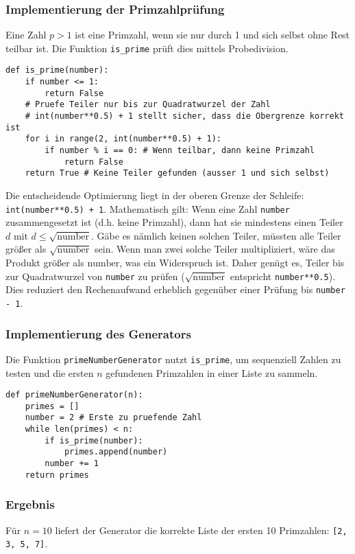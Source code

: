 \documentclass[titlepage]{article}
\begin{document}
\subsubsection{Implementierung der Primzahlprüfung}
Eine Zahl $p > 1$ ist eine Primzahl, wenn sie nur durch 1 und sich selbst ohne Rest teilbar ist. Die Funktion \texttt{is\_prime} prüft dies mittels Probedivision.
\begin{lstlisting}[caption={Python-Funktion zur Prüfung auf Primalität}, label=lst:is_prime]
def is_prime(number):
    if number <= 1:
        return False
    # Pruefe Teiler nur bis zur Quadratwurzel der Zahl
    # int(number**0.5) + 1 stellt sicher, dass die Obergrenze korrekt ist
    for i in range(2, int(number**0.5) + 1):
        if number % i == 0: # Wenn teilbar, dann keine Primzahl
            return False
    return True # Keine Teiler gefunden (ausser 1 und sich selbst)
\end{lstlisting}
Die entscheidende Optimierung liegt in der oberen Grenze der Schleife: \texttt{int(number**0.5) + 1}. Mathematisch gilt: Wenn eine Zahl \texttt{number} zusammengesetzt ist (d.h. keine Primzahl), dann hat sie mindestens einen Teiler $d$ mit $d \leq \sqrt{\text{number}}$. Gäbe es nämlich keinen solchen Teiler, müssten alle Teiler größer als $\sqrt{\text{number}}$ sein. Wenn man zwei solche Teiler multipliziert, wäre das Produkt größer als $\text{number}$, was ein Widerspruch ist. Daher genügt es, Teiler bis zur Quadratwurzel von \texttt{number} zu prüfen ($\sqrt{\text{number}}$ entspricht \texttt{number**0.5}). Dies reduziert den Rechenaufwand erheblich gegenüber einer Prüfung bis \texttt{number - 1}.

\subsubsection{Implementierung des Generators}
Die Funktion \texttt{primeNumberGenerator} nutzt \texttt{is\_prime}, um sequenziell Zahlen zu testen und die ersten $n$ gefundenen Primzahlen in einer Liste zu sammeln.
\begin{lstlisting}[caption={Python-Funktion zur Generierung der ersten n Primzahlen}, label=lst:prime_gen]
def primeNumberGenerator(n):
    primes = []
    number = 2 # Erste zu pruefende Zahl
    while len(primes) < n:
        if is_prime(number):
            primes.append(number)
        number += 1
    return primes
\end{lstlisting}

\subsubsection{Ergebnis}
Für $n=10$ liefert der Generator die korrekte Liste der ersten 10 Primzahlen: \texttt{[2, 3, 5, 7]}.
\end{document}
